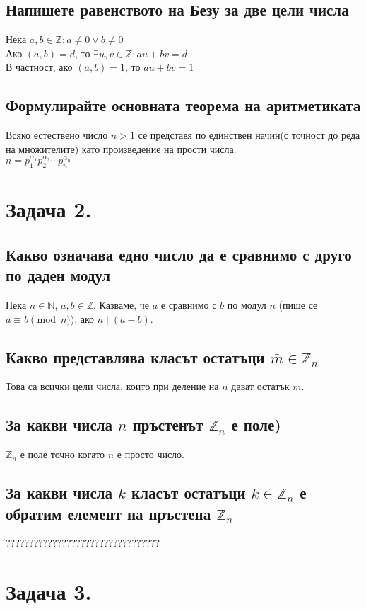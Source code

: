 \documentclass[10pt]{article}
\newcommand*{\Z}{\mathbb{Z}}
\newcommand*{\N}{\mathbb{N}}
\begin{document}
\subsection*{Напишете равенството на Безу за две цели числа}
Нека $a, b \in \Z: a \neq 0 \vee b \neq 0$\\
Ако $(a, b) = d$, то $\exists u, v \in \Z: au + bv = d$\\
В частност, ако $(a, b) = 1$, то $au + bv = 1$

\subsection*{Формулирайте основната теорема на аритметиката}
Всяко естествено число $n > 1$ се представя по единствен начин(с точност до реда на множителите) като произведение на прости числа.\\
$n = p_1^{\alpha_1} p_2^{\alpha_2} \cdots p_n^{\alpha_n}$

\section*{Задача 2.}

\subsection*{Какво означава едно число да е сравнимо с друго по даден модул}
Нека $n \in \N$, $a, b \in \Z$. Казваме, че $a$ е сравнимо с $b$ по модул $n$ (пише се $a \equiv b \pmod{n}$), ако $n \mid (a - b)$.

\subsection*{Какво представлява класът остатъци $\bar{m} \in \Z_n$}
Това са всички цели числа, които при деление на $n$ дават остатък $m$.

\subsection*{За какви числа $n$ пръстенът $\Z_n$ е поле)}
$\Z_n$ е поле точно когато $n$ е просто число.

\subsection*{За какви числа $k$ класът остатъци $k \in \Z_n$ е обратим елемент на пръстена $\Z_n$}
?????????????????????????????????

\section*{Задача 3.}
\end{document}
